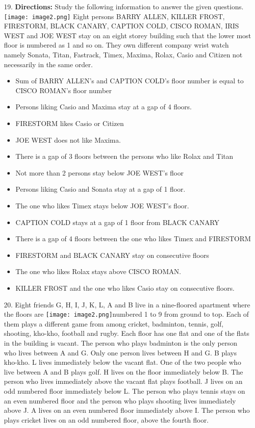 \documentclass[
]{article}
\begin{document}
19. \textbf{Directions:} Study the following information to answer the given questions.\\
\texttt{[image: image2.png]}
Eight persons BARRY ALLEN, KILLER FROST, FIRESTORM, BLACK CANARY, CAPTION
COLD, CISCO ROMAN, IRIS WEST and JOE WEST stay on an eight storey building such
that the lower most floor is numbered as 1 and so on. They own different company wrist
watch namely Sonata, Titan, Fastrack, Timex, Maxima, Rolax, Casio and Citizen not
necessarily in the same order.\\
\begin{itemize}
    \item Sum of BARRY ALLEN's and CAPTION COLD's floor number is equal to CISCO
ROMAN's floor number
\item Persons liking Casio and Maxima stay at a gap of 4 floors.
\item FIRESTORM likes Casio or Citizen
\item JOE WEST does not like Maxima.
\item There is a gap of 3 floors between the persons who like Rolax and Titan
\item Not more than 2 persons stay below JOE WEST's floor
\item Persons liking Casio and Sonata stay at a gap of 1 floor.
\item The one who likes Timex stays below JOE WEST's floor.
\item CAPTION COLD stays at a gap of 1 floor from BLACK CANARY
\item There is a gap of 4 floors between the one who likes Timex and FIRESTORM
\item FIRESTORM and BLACK CANARY stay on consecutive floors
\item The one who likes Rolax stays above CISCO ROMAN.
\item KILLER FROST and the one who likes Casio stay on consecutive floors.
\end{itemize}

20. Eight friends G, H, I, J, K, L, A and B live in a nine-floored apartment where the floors are
 \texttt{[image: image2.png]}numbered 1 to 9 from ground to top. Each of them plays a different game from among
cricket, badminton, tennis, golf, shooting, kho-kho, football and rugby. Each floor has one
flat and one of the flats in the building is vacant. The person who plays badminton is the
only person who lives between A and G. Only one person lives between H and G. B plays
kho-kho. L lives immediately below the vacant flat. One of the two people who live between
A and B plays golf. H lives on the floor immediately below B. The person who lives
immediately above the vacant flat plays football. J lives on an odd numbered floor
immediately below L. The person who plays tennis stays on an even numbered floor and
the person who plays shooting lives immediately above J. A lives on an even numbered
floor immediately above I. The person who plays cricket lives on an odd numbered floor,
above the fourth floor.\\
\end{document}
